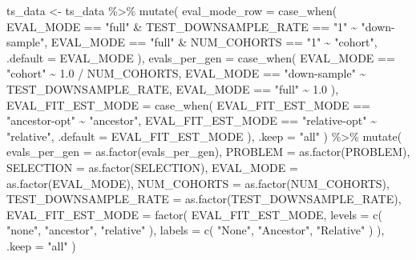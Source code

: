 \documentclass[
]{book}
\newenvironment{Shaded}{\begin{snugshade}}{\end{snugshade}}
\newcommand{\AttributeTok}[1]{\textcolor[rgb]{0.77,0.63,0.00}{#1}}
\newcommand{\FloatTok}[1]{\textcolor[rgb]{0.00,0.00,0.81}{#1}}
\newcommand{\FunctionTok}[1]{\textcolor[rgb]{0.00,0.00,0.00}{#1}}
\newcommand{\NormalTok}[1]{#1}
\newcommand{\OtherTok}[1]{\textcolor[rgb]{0.56,0.35,0.01}{#1}}
\newcommand{\SpecialCharTok}[1]{\textcolor[rgb]{0.00,0.00,0.00}{#1}}
\newcommand{\StringTok}[1]{\textcolor[rgb]{0.31,0.60,0.02}{#1}}
\begin{document}
\begin{Shaded}
\begin{Highlighting}[]
\NormalTok{ts\_data }\OtherTok{\textless{}{-}}\NormalTok{ ts\_data }\SpecialCharTok{\%\textgreater{}\%}
  \FunctionTok{mutate}\NormalTok{(}
    \AttributeTok{eval\_mode\_row =} \FunctionTok{case\_when}\NormalTok{(}
\NormalTok{      EVAL\_MODE }\SpecialCharTok{==} \StringTok{"full"} \SpecialCharTok{\&}\NormalTok{ TEST\_DOWNSAMPLE\_RATE }\SpecialCharTok{==} \StringTok{"1"} \SpecialCharTok{\textasciitilde{}} \StringTok{"down{-}sample"}\NormalTok{,}
\NormalTok{      EVAL\_MODE }\SpecialCharTok{==} \StringTok{"full"} \SpecialCharTok{\&}\NormalTok{ NUM\_COHORTS }\SpecialCharTok{==} \StringTok{"1"} \SpecialCharTok{\textasciitilde{}} \StringTok{"cohort"}\NormalTok{,}
      \AttributeTok{.default =}\NormalTok{ EVAL\_MODE}
\NormalTok{    ),}
    \AttributeTok{evals\_per\_gen =} \FunctionTok{case\_when}\NormalTok{(}
\NormalTok{      EVAL\_MODE }\SpecialCharTok{==} \StringTok{"cohort"} \SpecialCharTok{\textasciitilde{}} \FloatTok{1.0} \SpecialCharTok{/}\NormalTok{ NUM\_COHORTS,}
\NormalTok{      EVAL\_MODE }\SpecialCharTok{==} \StringTok{"down{-}sample"} \SpecialCharTok{\textasciitilde{}}\NormalTok{ TEST\_DOWNSAMPLE\_RATE,}
\NormalTok{      EVAL\_MODE }\SpecialCharTok{==} \StringTok{"full"} \SpecialCharTok{\textasciitilde{}} \FloatTok{1.0}
\NormalTok{    ),}
    \AttributeTok{EVAL\_FIT\_EST\_MODE =} \FunctionTok{case\_when}\NormalTok{(}
\NormalTok{      EVAL\_FIT\_EST\_MODE }\SpecialCharTok{==} \StringTok{"ancestor{-}opt"} \SpecialCharTok{\textasciitilde{}} \StringTok{"ancestor"}\NormalTok{,}
\NormalTok{      EVAL\_FIT\_EST\_MODE }\SpecialCharTok{==} \StringTok{"relative{-}opt"} \SpecialCharTok{\textasciitilde{}} \StringTok{"relative"}\NormalTok{,}
      \AttributeTok{.default =}\NormalTok{ EVAL\_FIT\_EST\_MODE}
\NormalTok{    ),}
    \AttributeTok{.keep =} \StringTok{"all"}
\NormalTok{  ) }\SpecialCharTok{\%\textgreater{}\%}
  \FunctionTok{mutate}\NormalTok{(}
    \AttributeTok{evals\_per\_gen =} \FunctionTok{as.factor}\NormalTok{(evals\_per\_gen),}
    \AttributeTok{PROBLEM =} \FunctionTok{as.factor}\NormalTok{(PROBLEM),}
    \AttributeTok{SELECTION =} \FunctionTok{as.factor}\NormalTok{(SELECTION),}
    \AttributeTok{EVAL\_MODE =} \FunctionTok{as.factor}\NormalTok{(EVAL\_MODE),}
    \AttributeTok{NUM\_COHORTS =} \FunctionTok{as.factor}\NormalTok{(NUM\_COHORTS),}
    \AttributeTok{TEST\_DOWNSAMPLE\_RATE =} \FunctionTok{as.factor}\NormalTok{(TEST\_DOWNSAMPLE\_RATE),}
    \AttributeTok{EVAL\_FIT\_EST\_MODE =} \FunctionTok{factor}\NormalTok{(}
\NormalTok{      EVAL\_FIT\_EST\_MODE,}
      \AttributeTok{levels =} \FunctionTok{c}\NormalTok{(}
        \StringTok{"none"}\NormalTok{,}
        \StringTok{"ancestor"}\NormalTok{,}
        \StringTok{"relative"}
\NormalTok{      ),}
      \AttributeTok{labels =} \FunctionTok{c}\NormalTok{(}
        \StringTok{"None"}\NormalTok{,}
        \StringTok{"Ancestor"}\NormalTok{,}
        \StringTok{"Relative"}
\NormalTok{      )}
\NormalTok{    ),}
    \AttributeTok{.keep =} \StringTok{"all"}
\NormalTok{  )}


\end{Highlighting}
\end{Shaded}
\end{document}
